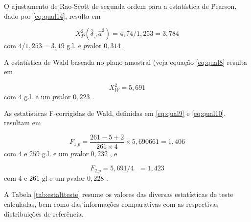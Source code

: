 \documentclass[]{book}
\theoremstyle{definition}
\theoremstyle{definition}
\theoremstyle{definition}
\theoremstyle{remark}
\begin{document}
O ajustamento de Rao-Scott de segunda ordem para a estatística de
Pearson, dado por \eqref{eq:qual14}, resulta em

\[
X_{P}^{2}\left( \hat{\delta}_{.},\hat{a}^{2}\right) =4,74/1,253=3,784 
\] com \(4\)/\(1,253=3,19\) g.l. e \(p\)valor \(0,314\) .

A estatística de Wald baseada no plano amostral (veja equação
\eqref{eq:qual8} resulta em

\[
X_{W}^{2}=5,691 
\] com \(4\) g.l. e um \(p\)valor \(0,223\) .

As estatísticas F-corrigidas de Wald, definidas em \eqref{eq:qual9} e
\eqref{eq:qual10}, resultam em

\[
F_{1.p}=\frac{261-5+2}{261\times 4}\times 5,690661=1,406 
\] com \(4\) e \(259\) g.l. e um \(p\)valor \(0,232\) , e

\[
F_{2.p}=5,691/4\mbox{ }=1,423 
\] com 4 e 261 gl e um \(p\)valor \(0,228\) .

A Tabela \ref{tab:estaltteste} resume os valores das diversas
estatísticas de teste calculadas, bem como das informações comparativas
com as respectivas distribuições de referência.
\end{document}
